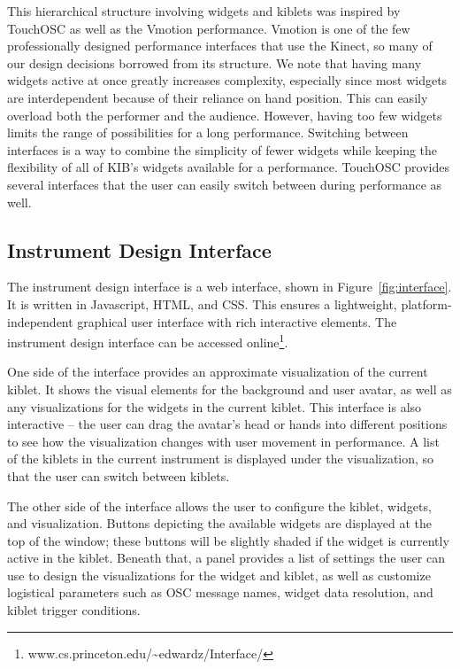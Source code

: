 \documentclass{nime-alternate}
\begin{document}
This hierarchical structure involving widgets and kiblets was inspired by TouchOSC as well as the Vmotion 
performance. Vmotion is one of the few professionally designed performance interfaces that use the Kinect,
so many of our design decisions borrowed from its structure. We note that having many
widgets active at once greatly increases complexity, especially since most widgets 
are interdependent because of their reliance on hand position.
This can easily overload both the performer and the audience.
However, having too few widgets limits the range of possibilities for a long
performance. Switching between interfaces is a way to combine the simplicity of
fewer widgets while keeping the flexibility of all of KIB's widgets available for a performance. 
TouchOSC provides several interfaces that the user can easily switch between during performance
as well.

\subsection{Instrument Design Interface}
The instrument design interface is a web interface, shown in Figure~\ref{fig:interface}. It is written in Javascript,
HTML, and CSS. This ensures a lightweight, platform-independent graphical user interface
with rich interactive elements. The instrument design interface can be accessed online\footnote{www.cs.princeton.edu/\textasciitilde{}edwardz/Interface/}.

One side of the interface provides an approximate visualization of the current kiblet. It shows the visual
elements for the background and user avatar, as well as any visualizations for the widgets
in the current kiblet. This interface is also interactive -- the user can drag the avatar's head or hands
into different positions to see how the visualization changes with user movement in performance. A list of the kiblets in the current instrument is displayed under the visualization, so
that the user can switch between kiblets.

The other side of the interface allows the user to configure the kiblet, widgets, and visualization.
Buttons depicting the available widgets are displayed at the top of the window; these buttons will be
slightly shaded if the widget is currently active in the kiblet. Beneath that, a panel provides a list of
settings the user can use to design the visualizations for the widget and kiblet, as well as customize logistical
parameters such as OSC message names, widget data resolution, and kiblet trigger conditions.
\end{document}
